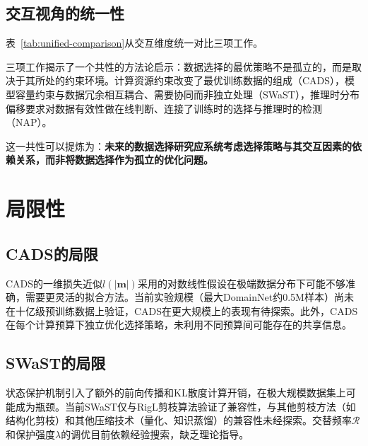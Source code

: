 \subsection{交互视角的统一性}

表~\ref{tab:unified-comparison}从交互维度统一对比三项工作。

\begin{table}[htb]
  \centering
  \caption{三项工作的统一对比——研究问题、阶段定位、交互变量、核心方法与关键发现}
  \label{tab:unified-comparison}
\end{table}

三项工作揭示了一个共性的方法论启示：数据选择的最优策略不是孤立的，而是取决于其所处的约束环境。计算资源约束改变了最优训练数据的组成（CADS），模型容量约束与数据冗余相互耦合、需要协同而非独立处理（SWaST），推理时分布偏移要求对数据有效性做在线判断、连接了训练时的选择与推理时的检测（NAP）。

这一共性可以提炼为：\textbf{未来的数据选择研究应系统考虑选择策略与其交互因素的依赖关系，而非将数据选择作为孤立的优化问题。}


\section{局限性}

\subsection{CADS的局限}

CADS的一维损失近似$l(|\mathbf{m}|)$采用的对数线性假设在极端数据分布下可能不够准确，需要更灵活的拟合方法\cite{kaplan2020scaling}。当前实验规模（最大DomainNet约0.5M样本）尚未在十亿级预训练数据上验证，CADS在更大规模上的表现有待探索。此外，CADS在每个计算预算下独立优化选择策略，未利用不同预算间可能存在的共享信息。%

\subsection{SWaST的局限}

状态保护机制引入了额外的前向传播和KL散度计算开销，在极大规模数据集上可能成为瓶颈。当前SWaST仅与RigL\cite{evci2020rigging}剪枝算法验证了兼容性，与其他剪枝方法（如结构化剪枝\cite{he2018soft}）和其他压缩技术（量化\cite{han2016deep, courbariaux2016binarized}、知识蒸馏）的兼容性未经探索。交替频率$\mathcal{R}$和保护强度$\lambda$的调优目前依赖经验搜索，缺乏理论指导。%

